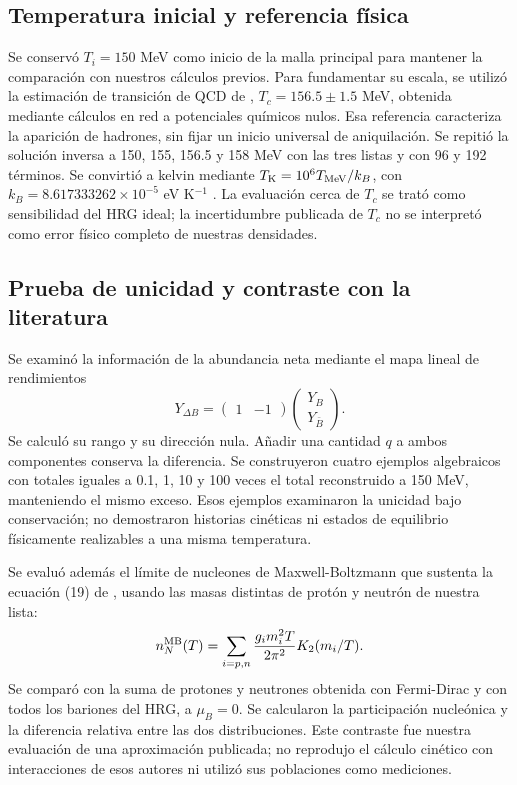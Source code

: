 \subsection{Temperatura inicial y referencia física}
Se conservó $T_i=150$ MeV como inicio de la malla principal para mantener la comparación con nuestros cálculos previos. Para fundamentar su escala, se utilizó la estimación de transición de QCD de \citet{Bazavov2019}, $T_c=156.5\pm1.5$ MeV, obtenida mediante cálculos en red a potenciales químicos nulos. Esa referencia caracteriza la aparición de hadrones, sin fijar un inicio universal de aniquilación. Se repitió la solución inversa a 150, 155, 156.5 y 158 MeV con las tres listas y con 96 y 192 términos. Se convirtió a kelvin mediante $T_{\rm K}=10^6T_{\rm MeV}/k_B$, con $k_B=8.617333262\times10^{-5}$ eV K$^{-1}$ \citep{Robinson2025}. La evaluación cerca de $T_c$ se trató como sensibilidad del HRG ideal; la incertidumbre publicada de $T_c$ no se interpretó como error físico completo de nuestras densidades.

\subsection{Prueba de unicidad y contraste con la literatura}
Se examinó la información de la abundancia neta mediante el mapa lineal de rendimientos
\begin{equation}
Y_{\Delta B}=\begin{pmatrix}1&-1\end{pmatrix}
\begin{pmatrix}Y_B\\Y_{\bar B}\end{pmatrix}.
\label{eq:rank}
\end{equation}
Se calculó su rango y su dirección nula. Añadir una cantidad $q$ a ambos componentes conserva la diferencia. Se construyeron cuatro ejemplos algebraicos con totales iguales a 0.1, 1, 10 y 100 veces el total reconstruido a 150 MeV, manteniendo el mismo exceso. Esos ejemplos examinaron la unicidad bajo conservación; no demostraron historias cinéticas ni estados de equilibrio físicamente realizables a una misma temperatura.

Se evaluó además el límite de nucleones de Maxwell-Boltzmann que sustenta la ecuación (19) de \citet{Satarov2013}, usando las masas distintas de protón y neutrón de nuestra lista:
\begin{equation}
n_N^{\rm MB}(T)=\sum_{i=p,n}
\frac{g_i m_i^2T}{2\pi^2}K_2(m_i/T).
\label{eq:nucleonMB}
\end{equation}
Se comparó con la suma de protones y neutrones obtenida con Fermi-Dirac y con todos los bariones del HRG, a $\mu_B=0$. Se calcularon la participación nucleónica y la diferencia relativa entre las dos distribuciones. Este contraste fue nuestra evaluación de una aproximación publicada; no reprodujo el cálculo cinético con interacciones de esos autores ni utilizó sus poblaciones como mediciones.

